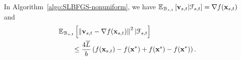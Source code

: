 \documentclass[10pt,twocolumn,journal]{IEEEtran}
\begin{document}
\begin{lemma}\label{lem:bound_var}
In Algorithm~\ref{algo:SLBFGS-nonuniform}, we have $\mathbb{E}_{\mathcal{B}_{s,t}}\left[\mathbf{v}_{s,t}\vert\mathcal{F}_{s,t}\right] = \nabla f(\mathbf{x}_{s,t})$ and 
\begin{align}
&\mathbb{E}_{\mathcal{B}_{s,t}}\left[\left\Vert\mathbf{v}_{s,t}-\nabla f(\mathbf{x}_{s,t})\right\Vert^2\vert\mathcal{F}_{s,t}\right]\nonumber\\
&\quad\quad\le \frac{4\overline{L}}{b} \left(f(\mathbf{x}_{s,t})-f(\mathbf{x}^*)+f(\mathbf{x}^s)-f(\mathbf{x}^*)\right).\label{eq:bound_var}
\end{align}
\end{lemma}
\end{document}
